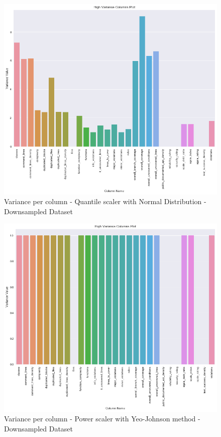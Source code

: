 \begin{figure}[!h]
    \centering
    \includegraphics[scale=0.6]{Figures/Variance/downsample/Comparison_of_variance_per_column_for_quantile-normal_downsampled_dataset.png}
    \caption{Variance per column - Quantile scaler with Normal Distribution - Downsampled Dataset}
    \label{fig:scalers:variance-quantile-normal-downsample}
\end{figure}

\begin{figure}[!h]
    \centering
    \includegraphics[scale=0.6]{Figures/Variance/downsample/Comparison_of_variance_per_column_for_power-yeo-johnson_downsampled_dataset.png}
    \caption{Variance per column - Power scaler with Yeo-Johnson method - Downsampled Dataset}
    \label{fig:scalers:variance-power-yeo-johnson-downsample}
\end{figure}

